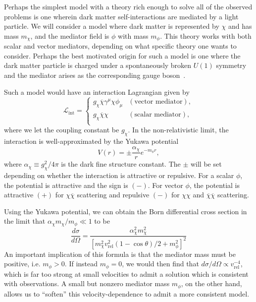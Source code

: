 Perhaps the simplest model with a theory rich enough to solve all of the
observed problems is one wherein dark matter self-interactions are
mediated by a light particle. We will consider a model where dark matter
is represented by \(\chi\) and has mass \(m_\chi\), and the mediator
field is \(\phi\) with mass \(m_\phi\). This theory works with both
scalar and vector mediators, depending on what specific theory one wants
to consider. Perhaps the best motivated origin for such a model is one
where the dark matter particle is charged under a spontaneously broken
\(U(1)\) symmetry and the mediator arises as the corresponding gauge
boson~\cite{tulin_dark_2018}.

Such a model would have an interaction Lagrangian given by
\begin{equation}
\mathcal{L}_{\text{int}} =
\left\{ 
\begin{array}{cl}
    g_\chi \overline{\chi} \gamma^\mu \chi \phi_\mu
    & (\text{vector mediator}), \\
    g_\chi \overline{\chi} \chi
    & (\text{scalar mediator}), \\
\end{array}
\right.
\end{equation}
where we let the coupling constant be \(g_\chi\). In the non-relativistic
limit, the interaction is well-approximated by the Yukawa potential~\cite{tulin_beyond_2013,tulin_resonant_2013}
\begin{equation}
V(r) = \pm \frac{\alpha_\chi}{r} e^{-m_\phi r},
\end{equation}
where \(\alpha_\chi \equiv g_\chi^2/4\pi\) is the dark fine structure
constant. The \(\pm\) will be set depending on whether the interaction is
attractive or repulsive. For a scalar \(\phi\), the potential is attractive
and the sign is \((-)\). For vector \(\phi\), the potential is attractive
\((+)\) for \(\chi\overline{\chi}\) scattering and repulsive \((-)\) for
\(\chi\chi\) and \(\overline{\chi}\overline{\chi}\) scattering.

Using the Yukawa potential, we can obtain the Born differential cross section
in the limit that \(\alpha_\chi m_\chi / m_\phi \ll 1\) to
be~\cite{tulin_dark_2018}
\begin{equation}
\frac{d\sigma}{d\Omega} = \frac{\alpha_\chi^2 m_\chi^2}{\left[
    m_\chi^2 v_{\text{rel}}^2 (1 - \cos\theta) / 2
    + m_\phi^2 \right]^2}
\end{equation}
An important implication of this formula is that the mediator mass must be
positive, i.e. \(m_\phi > 0\). If instead \(m_\phi = 0\), we would then find
that \( d\sigma/d\Omega \propto v_{\text{rel}}^{-4}\), which is far too strong
at small velocities to admit a solution which is consistent with observations.
A small but nonzero mediator mass \(m_\phi\), on the other hand, allows us to
``soften'' this velocity-dependence to admit a more consistent model.

